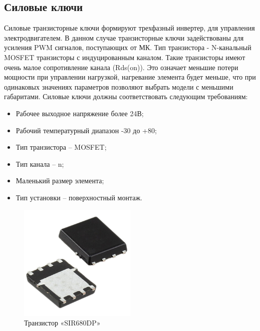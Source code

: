 \subsection{Силовые ключи}
Силовые транзисторные ключи формируют трехфазный инвертер, для управления электродвигателем.  В данном случае транзисторные ключи задействованы для усиления PWM сигналов, поступающих от МК. Тип транзистора - N-канальный MOSFET транзисторы с индуцированным каналом. Такие транзисторы имеют очень малое сопротивление канала (Rds(on)). Это означает меньшие потери мощности при управлении нагрузкой, нагревание элемента будет меньше, что при одинаковых значениях параметров позволяют выбрать модели с меньшими габаритами. Силовые ключи должны соответствовать следующим требованиям:
\begin{itemize}
	\item Рабочее выходное напряжение более 24В;
	\item Рабочий температурный диапазон -30 до +80;
	\item Тип транзистора – MOSFET;
	\item Тип канала – n;
	\item Маленький размер элемента;
	\item Тип установки – поверхностный монтаж.
\end{itemize}
\begin{figure}[H]
	\centering
	\includegraphics[width=0.5\textwidth]{Src/images/Transistir.png}
	\caption{Транзистор «SIR680DP»}
	\label{SIR680DP}
\end{figure}





